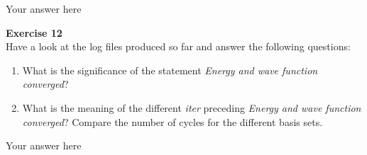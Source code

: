 \documentclass{article}
\begin{document}
Your answer here

\begin{mdframed}
\textbf{Exercise 12}\\
Have a look at the log files produced so far and answer the following questions:

\begin{enumerate}
\item What is the significance of the statement \textit{Energy and wave function converged}?


\item What is the meaning of the different \textit{iter} preceding \textit{Energy and wave function converged}?
Compare the number of cycles for the different basis sets.
\end{enumerate}
\end{mdframed}

Your answer here
\end{document}
